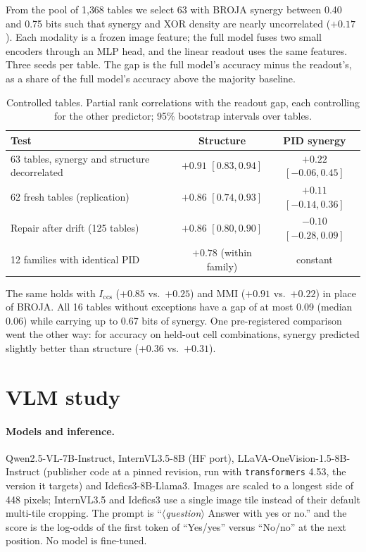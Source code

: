 From the pool of 1{,}368 tables we select 63 with BROJA synergy between 0.40 and 0.75 bits
such that synergy and XOR density are nearly uncorrelated ($+0.17$). Each modality is a frozen
image feature; the full model fuses two small encoders through an MLP head, and the linear
readout uses the same features. Three seeds per table. The gap is the full model's accuracy
minus the readout's, as a share of the full model's accuracy above the majority baseline.

\begin{table}[h]
\centering\small
\caption{Controlled tables. Partial rank correlations with the readout gap, each controlling
for the other predictor; 95\% bootstrap intervals over tables.}
\label{tab:sup_controlled}
\begin{tabular}{lcc}
\toprule
Test & Structure & PID synergy \\
\midrule
63 tables, synergy and structure decorrelated & $+0.91$ $[0.83, 0.94]$ & $+0.22$ $[-0.06, 0.45]$ \\
62 fresh tables (replication) & $+0.86$ $[0.74, 0.93]$ & $+0.11$ $[-0.14, 0.36]$ \\
Repair after drift (125 tables) & $+0.86$ $[0.80, 0.90]$ & $-0.10$ $[-0.28, 0.09]$ \\
12 families with identical PID & $+0.78$ (within family) & constant \\
\bottomrule
\end{tabular}
\end{table}

\noindent
The same holds with $I_{\mathrm{ccs}}$ ($+0.85$ vs.\ $+0.25$) and MMI ($+0.91$ vs.\ $+0.22$)
in place of BROJA. All 16 tables without exceptions have a gap of at most 0.09 (median 0.06)
while carrying up to 0.67 bits of synergy. One pre-registered comparison went the other way:
for accuracy on held-out cell combinations, synergy predicted slightly better than structure
($+0.36$ vs.\ $+0.31$).

\section{VLM study}
\label{sup:vlm}

\paragraph{Models and inference.}
Qwen2.5-VL-7B-Instruct, InternVL3.5-8B (HF port), LLaVA-OneVision-1.5-8B-Instruct (publisher
code at a pinned revision, run with \texttt{transformers} 4.53, the version it targets) and
Idefics3-8B-Llama3. Images are scaled to a longest side of 448 pixels; InternVL3.5 and
Idefics3 use a single image tile instead of their default multi-tile cropping. The prompt is
``\textit{$\langle$question$\rangle$} Answer with yes or no.'' and the score is the log-odds of
the first token of ``Yes/yes'' versus ``No/no'' at the next position. No model is fine-tuned.

